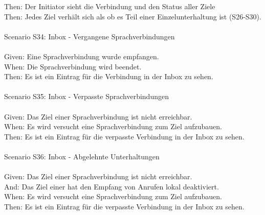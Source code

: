 \begin{tabbing}
    Then:   \> \> \> Der Initiator sieht die Verbindung und den Status aller Ziele \\
    Then:   \> \> \> Jedes Ziel verhält sich als ob es Teil einer Einzelunterhaltung ist (S26-S30).\\
    \\
    Scenario S34: \> \> \> Inbox - Vergangene Sprachverbindungen \\ \\
    Given:  \> \> \> Eine Sprachverbindung wurde empfangen. \\
    When:   \> \> \> Die Sprachverbindung wird beendet.  \\
    Then:   \> \> \> Es ist ein Eintrag für die Verbindung in der Inbox zu sehen. \\
    \\
    Scenario S35: \> \> \> Inbox - Verpasste Sprachverbindungen \\ \\
    Given:  \> \> \> Das Ziel einer Sprachverbindung ist nicht erreichbar. \\
    When:   \> \> \> Es wird versucht eine Sprachverbindung zum Ziel aufzubauen.\\
    Then:   \> \> \> Es ist ein Eintrag für die verpasste Verbindung in der Inbox zu sehen.\\
    \\
    Scenario S36: \> \> \> Inbox - Abgelehnte Unterhaltungen \\ \\
    Given:  \> \> \> Das Ziel einer Sprachverbindung ist nicht erreichbar. \\
    And:  \> \> \> Das Ziel einer hat den Empfang von Anrufen lokal deaktiviert. \\
    When:   \> \> \> Es wird versucht eine Sprachverbindung zum Ziel aufzubauen.\\
    Then:   \> \> \> Es ist ein Eintrag für die verpasste Verbindung in der Inbox zu sehen.\\
    \\
\end{tabbing}
\clearpage
